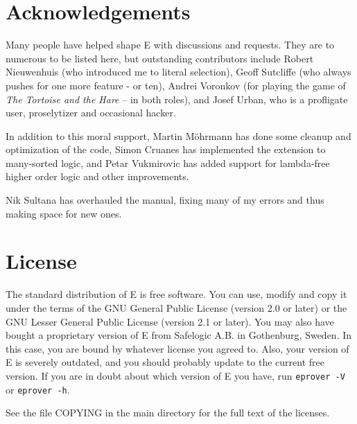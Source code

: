 \documentclass{report}
\begin{document}
\clearpage
\begin{appendix}
  \chapter{Acknowledgements}

   Many people have helped shape E with
  discussions and requests. They are to numerous to be listed here,
  but outstanding contributors include Robert Nieuwenhuis (who
  introduced me to literal selection), Geoff Sutcliffe (who always
  pushes for one more feature - or ten), Andrei Voronkov (for playing
  the game of \emph{The Tortoise and the Hare} -- in both roles), and
  Josef Urban, who is a profligate user, proselytizer and occasional
  hacker.

  In addition to this moral support, Martin M\"ohrmann has done some
  cleanup and optimization of the code, Simon Cruanes has implemented
  the extension to many-sorted logic, and Petar Vukmirovic has added
  support for lambda-free higher order logic and other improvements.

  Nik Sultana has overhauled the manual, fixing many of my errors and
  thus making space for new ones.

  \chapter{License}

   The standard distribution of E is free software. You
  can use, modify and copy it under the terms of the GNU General
  Public License (version 2.0 or later) or the GNU Lesser General
  Public License (version 2.1 or later). You may also have bought a
  proprietary version of E from Safelogic A.B. in Gothenburg,
  Sweden. In this case, you are bound by whatever license you agreed
  to. Also, your version of E is severely outdated, and you should
  probably update to the current free version. If you are in doubt
  about which version of E you have, run \texttt{eprover -V} or
  \texttt{eprover -h}.

  See the file COPYING in the main directory for the full text of the
  licenses.
\end{appendix}
\end{document}
